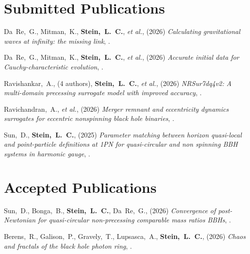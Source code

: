 \section{Submitted Publications}
\secstartswithlist{}%
\begin{etaremune}[start=\value{pubCounter}]
\item
  Da~Re,~G.,
  Mitman,~K.,
  {\bf Stein,~L.~C.},
  {\it et al.},
  (2026)
  {\it Calculating gravitational waves at infinity: the missing link},
  .
\item
  Da~Re,~G.,
  Mitman,~K.,
  {\bf Stein,~L.~C.},
  {\it et al.},
  (2026)
  {\it Accurate initial data for Cauchy-characteristic evolution},
  .
\item
  Ravishankar,~A.,
  (4 authors),
  {\bf Stein,~L.~C.},
  {\it et al.},
  (2026)
  {\it NRSur7dq4v2: A multi-domain precessing surrogate model with improved accuracy},
  .
\item
  Ravichandran,~A.,
  {\it et al.},
  (2026)
  {\it Merger remnant and eccentricity dynamics surrogates for eccentric nonspinning black hole binaries},
  .
\item
  Sun,~D.,
  {\bf Stein,~L.~C.},
  (2025)
  {\it Parameter matching between horizon quasi-local and point-particle
    definitions at 1PN for quasi-circular and non spinning BBH systems in
    harmonic gauge},
  .
  \setcounter{pubCounter}{\value{enumi}}
\end{etaremune}

\section{Accepted Publications}
\secstartswithlist{}%
\addtocounter{pubCounter}{-1}%
\begin{etaremune}[start=\value{pubCounter}]
\item
  Sun,~D.,
  Bonga,~B.,
  {\bf Stein,~L.~C.},
  Da~Re,~G.,
  (2026)
  {\it Convergence of post-Newtonian for quasi-circular non-precessing comparable mass ratios BBHs},
  .
\item
  Berens,~R.,
  Galison,~P.,
  Gravely,~T.,
  Lupsasca,~A.,
  {\bf Stein,~L.~C.},
  (2026)
  {\it Chaos and fractals of the black hole photon ring},
  .
%
  \setcounter{pubCounter}{\value{enumi}}
\end{etaremune}

